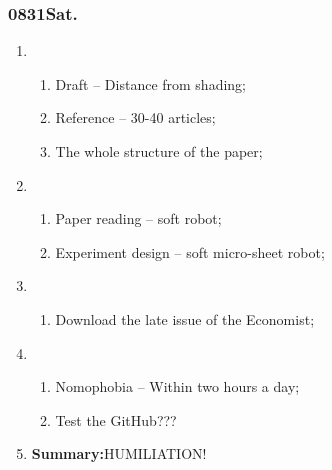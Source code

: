 \subsubsection{0831Sat.}
\begin{enumerate}
	\item \ncquaone
	\begin{enumerate}[(1)]
		\item Draft -- Distance from shading;\rightundoneBlack
		\item Reference -- 30-40 articles;\rightundoneBlack
		\item The whole structure of the paper;\rightundoneBlack
	\end{enumerate}
	
	\item \ncquatwo	
	\begin{enumerate}[(1)]
		\item Paper reading -- soft robot;\rightundoneBlack
		\item Experiment design -- soft micro-sheet robot;\rightundoneBlack
	\end{enumerate}
	
	\item \ncquathree
	\begin{enumerate}[(1)]
		\item Download the late issue of the Economist;\rightundoneBlack
	\end{enumerate}
	
	\item \ncquafour	
	\begin{enumerate}[(1)]
		\item Nomophobia -- Within two hours a day;\rightundoneBlack
		\item Test the GitHub???
	\end{enumerate}
	\item \textbf{Summary:}HUMILIATION! 
\end{enumerate}
